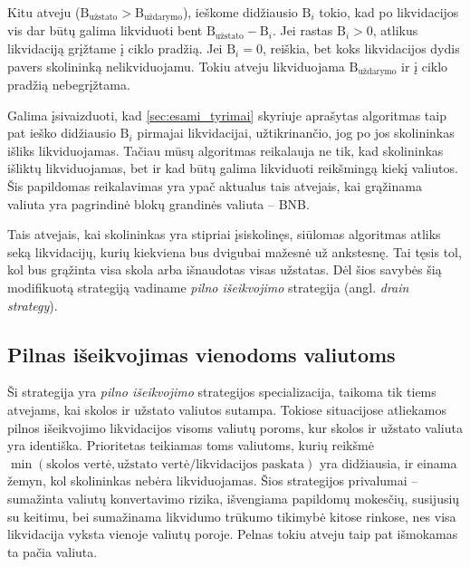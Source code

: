 \documentclass[]{VUMIFTemplateClass}
\begin{document}
Kitu atveju ($\text{B}_{\text{užstato}} > \text{B}_{\text{uždarymo}}$), ieškome didžiausio $\text{B}_{i}$ tokio, kad po likvidacijos vis dar būtų galima likviduoti bent $\text{B}_{\text{užstato}} - \text{B}_{i}$. Jei rastas $\text{B}_{i} > 0$, atlikus likvidaciją grįžtame į ciklo pradžią. Jei $\text{B}_{i} = 0$, reiškia, bet koks likvidacijos dydis pavers skolininką nelikviduojamu. Tokiu atveju likviduojama $\text{B}_{\text{uždarymo}}$ ir į ciklo pradžią nebegrįžtama.

Galima įsivaizduoti, kad \ref{sec:esami_tyrimai} skyriuje aprašytas algoritmas taip pat ieško didžiausio $\text{B}_{i}$ pirmajai likvidacijai, užtikrinančio, jog po jos skolininkas išliks likviduojamas. Tačiau mūsų algoritmas reikalauja ne tik, kad skolininkas išliktų likviduojamas, bet ir kad būtų galima likviduoti reikšmingą kiekį valiutos. Šis papildomas reikalavimas yra ypač aktualus tais atvejais, kai grąžinama valiuta yra pagrindinė blokų grandinės valiuta – BNB.

Tais atvejais, kai skolininkas yra stipriai įsiskolinęs, siūlomas algoritmas atliks seką likvidacijų, kurių kiekviena bus dvigubai mažesnė už ankstesnę. Tai tęsis tol, kol bus grąžinta visa skola arba išnaudotas visas užstatas. Dėl šios savybės šią modifikuotą strategiją vadiname \textit{pilno išeikvojimo} strategija (angl. \textit{drain strategy}).

\subsection{Pilnas išeikvojimas vienodoms valiutoms}

Ši strategija yra \textit{pilno išeikvojimo} strategijos specializacija, taikoma tik tiems atvejams, kai skolos ir užstato valiutos sutampa. Tokiose situacijose atliekamos pilnos išeikvojimo likvidacijos visoms valiutų poroms, kur skolos ir užstato valiuta yra identiška. Prioritetas teikiamas toms valiutoms, kurių reikšmė $\min(\text{skolos vertė}, \text{užstato vertė} / \text{likvidacijos paskata})$ yra didžiausia, ir einama žemyn, kol skolininkas nebėra likviduojamas. Šios strategijos privalumai – sumažinta valiutų konvertavimo rizika, išvengiama papildomų mokesčių, susijusių su keitimu, bei sumažinama likvidumo trūkumo tikimybė kitose rinkose, nes visa likvidacija vyksta vienoje valiutų poroje. Pelnas tokiu atveju taip pat išmokamas ta pačia valiuta.
\end{document}
